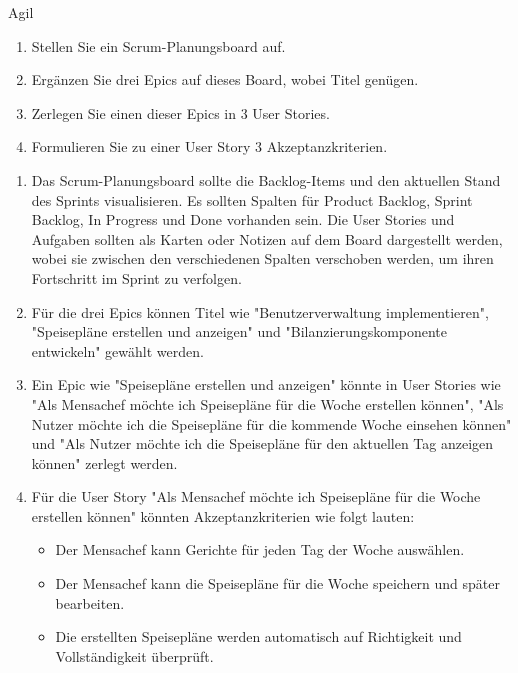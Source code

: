 \documentclass{article}
\begin{document}
\begin{exercise}{Agil}
  \begin{enumerate}
    \item Stellen Sie ein Scrum-Planungsboard auf.
    \item Ergänzen Sie drei Epics auf dieses Board, wobei Titel genügen.
    \item Zerlegen Sie einen dieser Epics in 3 User Stories.
    \item Formulieren Sie zu einer User Story 3 Akzeptanzkriterien.
  \end{enumerate}


  \begin{solution}
    \begin{enumerate}
      \item Das Scrum-Planungsboard sollte die Backlog-Items und den aktuellen Stand des Sprints visualisieren. Es sollten Spalten für Product Backlog, Sprint Backlog, In Progress und Done vorhanden sein. Die User Stories und Aufgaben sollten als Karten oder Notizen auf dem Board dargestellt werden, wobei sie zwischen den verschiedenen Spalten verschoben werden, um ihren Fortschritt im Sprint zu verfolgen.
      \item Für die drei Epics können Titel wie "Benutzerverwaltung implementieren", "Speisepläne erstellen und anzeigen" und "Bilanzierungskomponente entwickeln" gewählt werden.
      \item Ein Epic wie "Speisepläne erstellen und anzeigen" könnte in User Stories wie "Als Mensachef möchte ich Speisepläne für die Woche erstellen können", "Als Nutzer möchte ich die Speisepläne für die kommende Woche einsehen können" und "Als Nutzer möchte ich die Speisepläne für den aktuellen Tag anzeigen können" zerlegt werden.
      \item Für die User Story "Als Mensachef möchte ich Speisepläne für die Woche erstellen können" könnten Akzeptanzkriterien wie folgt lauten:
            \begin{itemize}
              \item Der Mensachef kann Gerichte für jeden Tag der Woche auswählen.
              \item Der Mensachef kann die Speisepläne für die Woche speichern und später bearbeiten.
              \item Die erstellten Speisepläne werden automatisch auf Richtigkeit und Vollständigkeit überprüft.
            \end{itemize}
    \end{enumerate}
  \end{solution}
\end{exercise}
\end{document}
